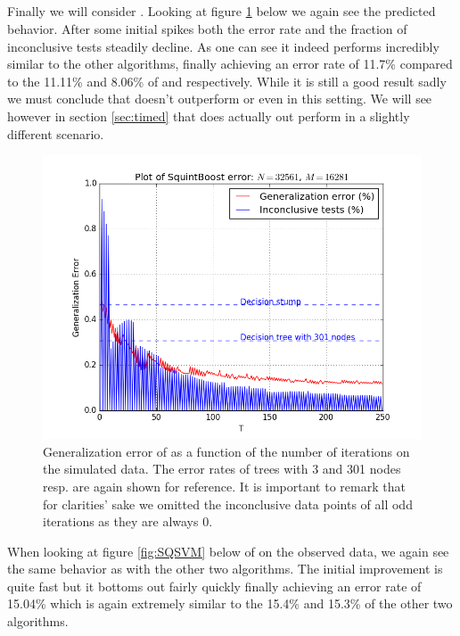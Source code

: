 \subsection{\squintB}
\label{subsec:sqPracPerf}
Finally we will consider \squintB. Looking at figure \ref{fig:SQGD} below we again see the predicted behavior. After some initial spikes both the error rate and the fraction of inconclusive tests steadily decline. As one can see it indeed performs incredibly similar to the other algorithms, finally achieving an error rate of 11.7\% compared to the 11.11\% and 8.06\% of \adaB and \NHB respectively. While it is still a good result sadly we must conclude that \squintB doesn't outperform \NHB or even \adaB in this setting. We will see however in section \ref{sec:timed} that \squintB does actually out perform \adaB in a slightly different scenario. 
\begin{figure}[!ht]
  \centering
      \includegraphics[width=\graphWidth]{generated/SQGD.png}
  \caption{Generalization error of \squintB as a function of the number of iterations on the simulated data. The error rates of trees with 3 and 301 nodes resp. are again shown for reference. It is important to remark that for clarities' sake we omitted the inconclusive data points of all odd iterations as they are always 0.}
      \label{fig:SQGD}
\end{figure}

\par When looking at figure \ref{fig:SQSVM} below of \squintB on the observed data, we again see the same behavior as with the other two algorithms. The initial improvement is quite fast but it bottoms out fairly quickly finally achieving an error rate of 15.04\% which is again extremely similar to the 15.4\% and 15.3\% of the other two algorithms. 

